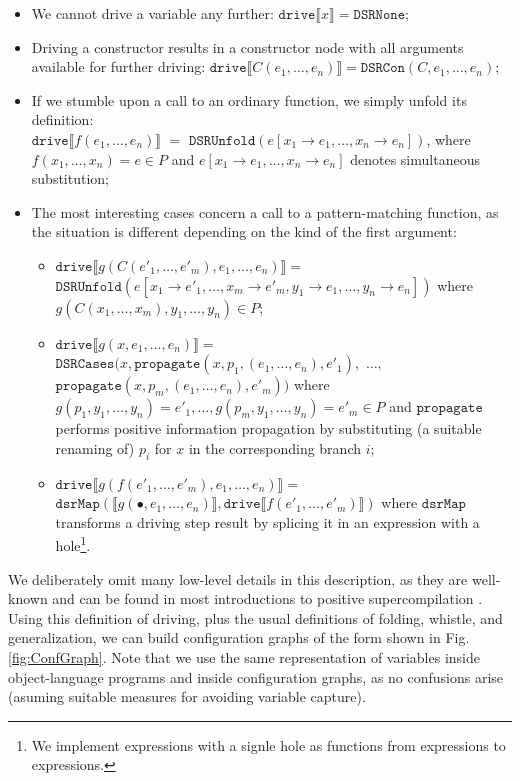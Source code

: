 \documentclass[submission,copyright,creativecommons]{eptcs}
\begin{document}
\begin{itemize}
  \item We cannot drive a variable any further: $\mathtt{drive} \llbracket x \rrbracket = \mathtt{DSRNone}$;
  \item Driving a constructor results in a constructor node with all arguments available for
    further driving: $\mathtt{drive} \llbracket C(e_1, \ldots, e_n) \rrbracket = \mathtt{DSRCon}(C, e_1, \ldots, e_n)$;
  \item If we stumble upon a call to an ordinary function, we simply unfold its definition: \\
    $\mathtt{drive} \llbracket f(e_1, \ldots, e_n) \rrbracket$ $=$ $\mathtt{DSRUnfold}(e [ x_1\rightarrow e_1, \ldots, x_n\rightarrow e_n ])$,
    where $f(x_1, \ldots, x_n) = e \in P$ and $e [ x_1\rightarrow e_1, \ldots, x_n\rightarrow e_n ] $
    denotes simultaneous substitution;
  \item The most interesting cases concern a call to a pattern-matching function, as the situation is
    different depending on the kind of the first argument:
    \begin{itemize}
      \item $\mathtt{drive} \llbracket g(C(e'_1, \ldots, e'_m), e_1, \ldots, e_n) \rrbracket =$
        $\mathtt{DSRUnfold}(e [ x_1\rightarrow e'_1, \ldots, x_m\rightarrow e'_m, y_1 \rightarrow e_1, \ldots, y_n \rightarrow e_n ])$
        where $g(C(x_1, \ldots, x_m), y_1, \ldots, y_n) \in P$;
      \item $\mathtt{drive} \llbracket g(x, e_1, \ldots, e_n) \rrbracket =$
        $\mathtt{DSRCases}(x, \mathtt{propagate}(x, p_1, (e_1, \ldots, e_n), e'_1),$ $\ldots,$ \\
          $\mathtt{propagate}(x, p_m, (e_1, \ldots, e_n), e'_m))$
        where $g(p_1, y_1, \ldots, y_n) = e'_1, \ldots, g(p_m, y_1, \ldots, y_n) = e'_m \in P$
        and $\mathtt{propagate}$ performs positive information propagation by substituting (a suitable renaming of) $p_i$ for $x$ 
        in the corresponding branch $i$;
      \item $\mathtt{drive} \llbracket g(f(e'_1, \ldots, e'_m), e_1, \ldots, e_n) \rrbracket =$
        $\mathtt{dsrMap}(\llbracket g(\bullet, e_1, \ldots, e_n) \rrbracket, \mathtt{drive} \llbracket f(e'_1, \ldots, e'_m) \rrbracket)$
        where $\mathtt{dsrMap}$ transforms a driving step result by splicing it in an expression with a hole\footnote{
        We implement expressions with a signle hole as functions from expressions to expressions.}.
    \end{itemize}
\end{itemize}
We deliberately omit many low-level details in this description, as they are well-known and can be found
in most introductions to positive supercompilation \cite{Sorensen1994TurchinSupercompiler,sorm98b,TMR/SCP2014}.
Using this definition of driving, plus the usual definitions of folding, whistle, and generalization, 
we can build configuration graphs of the form shown in Fig. \ref{fig:ConfGraph}.
Note that we use the same representation of variables inside object-language programs and inside configuration graphs,
as no confusions arise (asuming suitable measures for avoiding variable capture).
\end{document}
